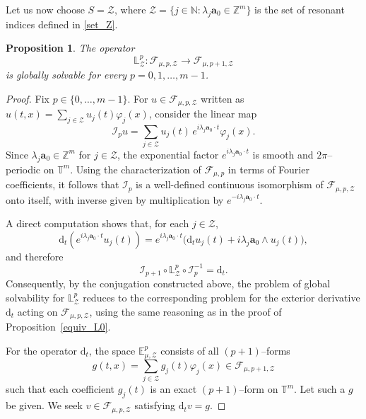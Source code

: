 \documentclass[12pt,reqno]{amsart}
\newtheorem{proposition}[theorem]{Proposition}
\theoremstyle{definition}
\numberwithin{equation}{section}
\begin{document}
Let us now choose $S = \mathcal{Z}$, where $\mathcal{Z} = \{j\in\mathbb{N}: \lambda_j\boldsymbol{a}_0\in\mathbb{Z}^m\} $ is the set of resonant indices defined in \eqref{set_Z}.

\begin{proposition}
	The operator
	\[
	\mathbb{L}^p_{\mathcal{Z}} :
	\mathscr{F}_{\mu,p,\mathcal{Z}}
	\longrightarrow
	\mathscr{F}_{\mu,p+1,\mathcal{Z}}
	\]
	is globally solvable for every $p=0,1,\dots,m-1$.
\end{proposition}

\begin{proof}
	Fix $p\in\{0,\dots,m-1\}$. For $u\in\mathscr{F}_{\mu,p,\mathcal{Z}}$ written as
	$u(t,x)=\sum_{j\in\mathcal{Z}}u_j(t)\varphi_j(x)$,
	consider the linear map
	\[
	\mathscr{I}_p u
	=
	\sum_{j\in\mathcal{Z}}u_j(t)\,e^{i\lambda_j\boldsymbol{a}_0\cdot t}\varphi_j(x).
	\]
	Since $\lambda_j\boldsymbol{a}_0\in\mathbb{Z}^m$ for $j\in\mathcal{Z}$,
	the exponential factor $e^{i\lambda_j\boldsymbol{a}_0\cdot t}$ is smooth and
	$2\pi$--periodic on $\mathbb{T}^m$.
	Using the characterization of $\mathscr{F}_{\mu,p}$ in terms of Fourier
	coefficients, it follows that $\mathscr{I}_p$ is a well-defined continuous
	isomorphism of $\mathscr{F}_{\mu,p,\mathcal{Z}}$ onto itself, with inverse
	given by multiplication by $e^{-i\lambda_j\boldsymbol{a}_0\cdot t}$.
	
	A direct computation shows that, for each $j\in\mathcal{Z}$,
	\[
	\mathrm{d}_t\!\left(e^{i\lambda_j\boldsymbol{a}_0\cdot t}u_j(t)\right)
	=
	e^{i\lambda_j\boldsymbol{a}_0\cdot t}
	\bigl(\mathrm{d}_t u_j(t)+ i\lambda_j \boldsymbol{a}_0\wedge u_j(t)\bigr),
	\]
	and therefore
	\[
	\mathscr{I}_{p+1}\circ\mathbb{L}^p_{\mathcal{Z}}\circ\mathscr{I}_p^{-1}
	=
	\mathrm{d}_t.
	\]
	Consequently, by the conjugation constructed above, the problem of global solvability for $\mathbb{L}^p_{\mathcal{Z}}$ reduces to the corresponding problem for the exterior derivative $\mathrm{d}_t$ acting on $\mathscr{F}_{\mu,p,\mathcal{Z}}$, using the same reasoning as in the proof of Proposition~\ref{equiv_L0}.

	
	For the operator $\mathrm{d}_t$, the space $\mathbb{E}^p_{\mu,\mathcal{Z}}$
	consists of all $(p+1)$--forms
	\[
	g(t,x)=\sum_{j\in\mathcal{Z}} g_j(t)\varphi_j(x)
	\in\mathscr{F}_{\mu,p+1,\mathcal{Z}}
	\]
	such that each coefficient $g_j(t)$ is an exact $(p+1)$--form on $\mathbb{T}^m$.
	Let such a $g$ be given. 	We seek $v\in\mathscr{F}_{\mu,p,\mathcal{Z}}$ satisfying
	\(\mathrm{d}_t v = g.\)
	

\end{proof}
\end{document}
